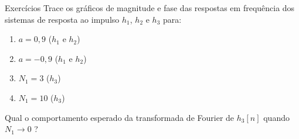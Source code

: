 \documentclass[
size=17pt,
paper=smartboard,
mode=present,
display=slidesnotes,
style=sailor,
nopagebreaks,
blackslide,
fleqn]{powerdot}
\begin{document}
\begin{note}[toc=]{Exercícios}
Trace os gráficos de magnitude e fase das respostas em frequência dos sistemas de resposta ao impulso $h_1$, $h_2$ e $h_3$ para: 
\begin{enumerate}
   \item $a = 0,9$ ($h_1$ e $h_2$)
   \item $a = -0,9$ ($h_1$ e $h_2$)
   \item $N_1 = 3$ ($h_3$)
   \item $N_1 = 10$  ($h_3$)
\end{enumerate}
Qual o comportamento esperado da transformada de Fourier de $h_3[n]$ quando $N_1\rightarrow 0$ ?
\end{note}
\end{document}

